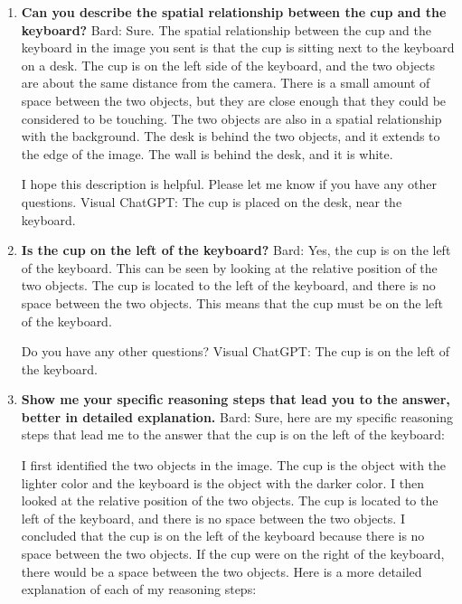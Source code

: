     \begin{enumerate}
        \item \textbf{Can you describe the spatial relationship between the cup and the keyboard?}
        \subitem Bard: 
        Sure. The spatial relationship between the cup and the keyboard in the image you sent is that the cup is sitting next to the keyboard on a desk. The cup is on the left side of the keyboard, and the two objects are about the same distance from the camera. There is a small amount of space between the two objects, but they are close enough that they could be considered to be touching.
        The two objects are also in a spatial relationship with the background. The desk is behind the two objects, and it extends to the edge of the image. The wall is behind the desk, and it is white.

        I hope this description is helpful. Please let me know if you have any other questions.
        \subitem Visual ChatGPT: The cup is placed on the desk, near the keyboard.
        \item \textbf{Is the cup on the left of the keyboard?}
        \subitem Bard: 
        Yes, the cup is on the left of the keyboard. This can be seen by looking at the relative position of the two objects. The cup is located to the left of the keyboard, and there is no space between the two objects. This means that the cup must be on the left of the keyboard.
        
        Do you have any other questions?
        \subitem Visual ChatGPT: The cup is on the left of the keyboard.
        \item \textbf{Show me your specific reasoning steps that lead you to the answer, better in detailed explanation.}
        \subitem Bard:
        Sure, here are my specific reasoning steps that lead me to the answer that the cup is on the left of the keyboard:
        
        I first identified the two objects in the image. The cup is the object with the lighter color and the keyboard is the object with the darker color.
        I then looked at the relative position of the two objects. The cup is located to the left of the keyboard, and there is no space between the two objects.
        I concluded that the cup is on the left of the keyboard because there is no space between the two objects. If the cup were on the right of the keyboard, there would be a space between the two objects.
        Here is a more detailed explanation of each of my reasoning steps:
        

\end{enumerate}
